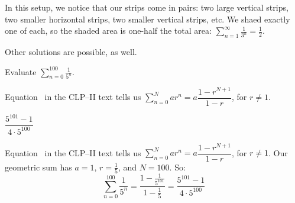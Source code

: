 \begin{solution}
In this setup, we notice that our strips come in pairs: two large vertical strips, two smaller horizontal strips, two smaller vertical strips, etc. We shaed exactly one of each, so the shaded area is one-half the total area: $\displaystyle\sum_{n=1}^\infty \frac{1}{3^n} = \frac12$.

Other solutions are possible, as well.
\end{solution}



\begin{question}
Evaluate $\displaystyle\sum_{n=0}^{100}\frac{1}{5^n}$.
\end{question}
\begin{hint}
Equation~ in the CLP--II text tells us
$\displaystyle\sum_{n=0}^N ar^n = a\dfrac{1-r^{N+1}}{1-r}$, for $r \neq 1$.
\end{hint}
\begin{answer}
$\dfrac{5^{101}-1}{4\cdot 5^{100}}$
\end{answer}
\begin{solution}
Equation~ in the CLP--II text tells us
$\displaystyle\sum_{n=0}^N ar^n = a\dfrac{1-r^{N+1}}{1-r}$, for $r \neq 1$.
Our geometric sum has $a=1$, $r=\frac{1}{5}$, and $N=100$. So:
\[\displaystyle\sum_{n=0}^{100}\frac{1}{5^n} =
\frac{1-\frac{1}{5^{101}}}{1-\frac{1}{5}} = \dfrac{5^{101}-1}{4\cdot 5^{100}}\]
\end{solution}

